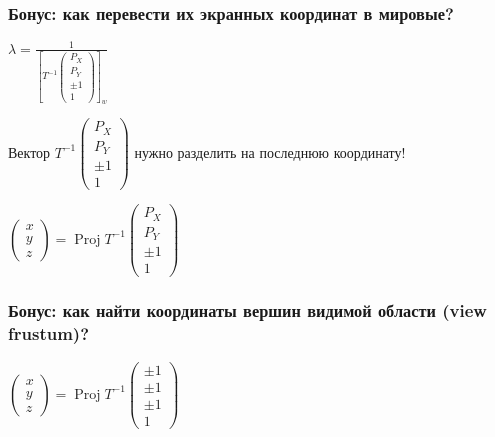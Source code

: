 \documentclass{beamer}
\begin{document}
\begin{frame}[fragile]
\frametitle{Бонус: как перевести их экранных координат в мировые?}
\begin{center}
\begin{math}
\lambda =
\frac{1}{
\left[
T^{-1} \begin{pmatrix}P_X \\ P_Y \\ \pm 1 \\ 1\end{pmatrix}
\right]_w}
\end{math}
\end{center}
\pause
Вектор \begin{math}T^{-1}\begin{pmatrix}P_X \\ P_Y \\ \pm 1 \\ 1\end{pmatrix}\end{math} нужно разделить на последнюю координату!
\pause
\begin{center}
\begin{math}
\begin{pmatrix}x \\ y \\ z\end{pmatrix} =
\operatorname{Proj} T^{-1} \begin{pmatrix}P_X \\ P_Y \\ \pm 1 \\ 1\end{pmatrix}
\end{math}
\end{center}
\end{frame}

\begin{frame}[fragile]
\frametitle{Бонус: как найти координаты вершин видимой области (view frustum)?}
\begin{center}
\begin{math}
\begin{pmatrix}x \\ y \\ z\end{pmatrix} =
\operatorname{Proj} T^{-1} \begin{pmatrix}\pm 1 \\ \pm 1 \\ \pm 1 \\ 1\end{pmatrix}
\end{math}
\end{center}
\end{frame}
\end{document}
